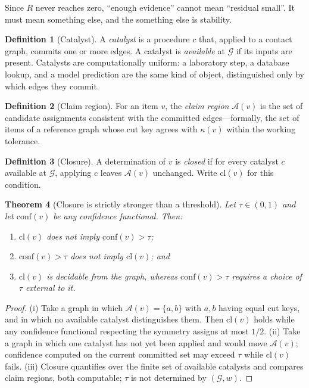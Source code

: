 \documentclass[11pt,a4paper]{article}
\newtheorem{theorem}{Theorem}[section]
\theoremstyle{definition}
\newtheorem{definition}[theorem]{Definition}
\theoremstyle{remark}
\newcommand{\Gph}{\mathcal{G}}              %
\newcommand{\wt}{w}                          %
\newcommand{\key}{\kappa}                    %
\newcommand{\resid}{R}                       %
\newcommand{\clos}{\mathrm{cl}}
\newcommand{\amb}{\mathcal{A}}               %
\begin{document}
Since $\resid$ never reaches zero, ``enough evidence'' cannot mean
``residual small''. It must mean something else, and the something else
is stability.

\begin{definition}[Catalyst]
\label{def:catalyst}
A \emph{catalyst} is a procedure $c$ that, applied to a contact graph,
commits one or more edges. A catalyst is \emph{available} at $\Gph$ if
its inputs are present. Catalysts are computationally uniform: a
laboratory step, a database lookup, and a model prediction are the same
kind of object, distinguished only by which edges they commit.
\end{definition}

\begin{definition}[Claim region]
\label{def:claim}
For an item $v$, the \emph{claim region} $\amb(v)$ is the set of
candidate assignments consistent with the committed edges---formally,
the set of items of a reference graph whose cut key agrees with
$\key(v)$ within the working tolerance.
\end{definition}

\begin{definition}[Closure]
\label{def:closure}
A determination of $v$ is \emph{closed} if for every catalyst $c$
available at $\Gph$, applying $c$ leaves $\amb(v)$ unchanged. Write
$\clos(v)$ for this condition.
\end{definition}

\begin{theorem}[Closure is strictly stronger than a threshold]
\label{thm:closure-stronger}
Let $\tau\in(0,1)$ and let $\mathrm{conf}(v)$ be any confidence
functional. Then:
\begin{enumerate}[label=\textup{(\roman*)},leftmargin=2.2em,itemsep=1pt]
  \item $\clos(v)$ does not imply $\mathrm{conf}(v)>\tau$;
  \item $\mathrm{conf}(v)>\tau$ does not imply $\clos(v)$; and
  \item $\clos(v)$ is decidable from the graph, whereas
  $\mathrm{conf}(v)>\tau$ requires a choice of $\tau$ external to it.
\end{enumerate}
\end{theorem}

\begin{proof}
(i) Take a graph in which $\amb(v)=\{a,b\}$ with $a,b$ having equal cut
keys, and in which no available catalyst distinguishes them. Then
$\clos(v)$ holds while any confidence functional respecting the symmetry
assigns at most $1/2$. (ii) Take a graph in which one catalyst has not
yet been applied and would move $\amb(v)$; confidence computed on the
current committed set may exceed $\tau$ while $\clos(v)$ fails. (iii)
Closure quantifies over the finite set of available catalysts and
compares claim regions, both computable; $\tau$ is not determined by
$(\Gph,\wt)$.
\end{proof}
\end{document}
